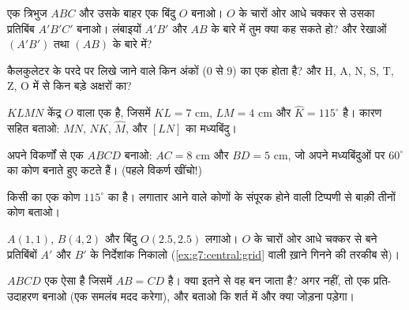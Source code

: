 \begin{exercise}[$\star$]\label{exo:g7:central:2}
एक त्रिभुज $ABC$ और उसके बाहर एक बिंदु $O$ बनाओ। $O$ के चारों ओर
आधे चक्कर से उसका प्रतिबिंब $A'B'C'$ बनाओ। लंबाइयों $A'B'$ और $AB$
के बारे में तुम क्या कह सकते हो? और रेखाओं $(A'B')$ तथा $(AB)$ के
बारे में?
\end{exercise}

\begin{exercise}[$\star$]\label{exo:g7:central:3}
कैलकुलेटर के परदे पर लिखे जाने वाले किन अंकों ($0$ से $9$) का एक
 होता है? और H, A, N, S, T, Z, O में से किन बड़े अक्षरों
का?
\end{exercise}

\begin{exercise}[$\star$]\label{exo:g7:central:4}
$KLMN$ केंद्र $O$ वाला एक  है, जिसमें $KL = 7$ cm,
$LM = 4$ cm और $\widehat K = 115^\circ$ है। कारण सहित बताओ: $MN$,
$NK$, $\widehat M$, और $[LN]$ का मध्यबिंदु।
\end{exercise}

\begin{exercise}[$\star$]\label{exo:g7:central:5}
अपने विकर्णों से एक  $ABCD$ बनाओ: $AC = 8$ cm और
$BD = 5$ cm, जो अपने मध्यबिंदुओं पर $60^\circ$ का कोण बनाते हुए
कटते हैं। (पहले विकर्ण खींचो!)
\end{exercise}

\begin{exercise}[$\star$]\label{exo:g7:central:6}
किसी  का एक कोण $115^\circ$ का है। लगातार आने वाले
कोणों के संपूरक होने वाली टिप्पणी से बाक़ी तीनों कोण बताओ।
\end{exercise}

\begin{exercise}[$\star\star$]\label{exo:g7:central:7}
$A(1, 1)$, $B(4, 2)$ और बिंदु $O(2.5, 2.5)$ लगाओ। $O$ के चारों ओर
आधे चक्कर से बने प्रतिबिंबों $A'$ और $B'$ के निर्देशांक निकालो
(\cref{ex:g7:central:grid} वाली ख़ाने गिनने की तरकीब से)।
\end{exercise}

\begin{exercise}[$\star\star$]\label{exo:g7:central:8}
$ABCD$ एक ऐसा  है जिसमें $AB = CD$ है। क्या इतने से वह
 बन जाता है? अगर नहीं, तो एक प्रति-उदाहरण बनाओ (एक
 समलंब मदद करेगा), और बताओ कि शर्त में और क्या जोड़ना
पड़ेगा।
\end{exercise}

